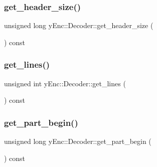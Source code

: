 \hypertarget{classy_enc_1_1_decoder_a9a1344c2af59e63c4216ac98f1514187}{}\label{classy_enc_1_1_decoder_a9a1344c2af59e63c4216ac98f1514187} 
\subsubsection{\texorpdfstring{get\+\_\+header\+\_\+size()}{get\_header\_size()}}
{\footnotesize\ttfamily unsigned long y\+Enc\+::\+Decoder\+::get\+\_\+header\+\_\+size (\begin{DoxyParamCaption}{ }\end{DoxyParamCaption}) const\hspace{0.3cm}{\ttfamily [inline]}}

\hypertarget{classy_enc_1_1_decoder_a3d660308cbae7e42c7dc7ed16a4c1308}{}\label{classy_enc_1_1_decoder_a3d660308cbae7e42c7dc7ed16a4c1308} 
\subsubsection{\texorpdfstring{get\+\_\+lines()}{get\_lines()}}
{\footnotesize\ttfamily unsigned int y\+Enc\+::\+Decoder\+::get\+\_\+lines (\begin{DoxyParamCaption}{ }\end{DoxyParamCaption}) const\hspace{0.3cm}{\ttfamily [inline]}}

\hypertarget{classy_enc_1_1_decoder_ac40379f6d0fc2dbb60864df1cee65b03}{}\label{classy_enc_1_1_decoder_ac40379f6d0fc2dbb60864df1cee65b03} 
\subsubsection{\texorpdfstring{get\+\_\+part\+\_\+begin()}{get\_part\_begin()}}
{\footnotesize\ttfamily unsigned long y\+Enc\+::\+Decoder\+::get\+\_\+part\+\_\+begin (\begin{DoxyParamCaption}{ }\end{DoxyParamCaption}) const\hspace{0.3cm}{\ttfamily [inline]}}


